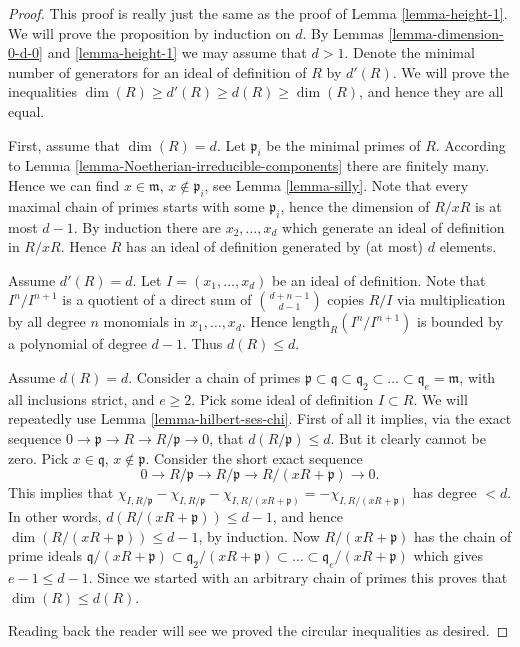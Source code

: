\begin{proof}
This proof is really just the same as the proof of Lemma
\ref{lemma-height-1}. We will prove the proposition by induction
on $d$. By Lemmas \ref{lemma-dimension-0-d-0} and \ref{lemma-height-1}
we may assume that $d > 1$. Denote the minimal number of
generators for an ideal of definition of $R$ by $d'(R)$.
We will prove the inequalities
$\dim(R) \geq d'(R) \geq d(R) \geq \dim(R)$,
and hence they are all equal.

\medskip\noindent
First, assume that $\dim(R) = d$.
Let $\mathfrak p_i$ be the minimal primes of $R$.
According to Lemma \ref{lemma-Noetherian-irreducible-components}
there are finitely many. Hence we can find $x \in \mathfrak m$,
$x \not \in \mathfrak p_i$, see Lemma \ref{lemma-silly}.
Note that every maximal chain of primes starts with some $\mathfrak p_i$,
hence the dimension of $R/xR$ is at most $d-1$. By induction
there are $x_2, \ldots, x_d$ which generate an ideal of definition
in $R/xR$. Hence $R$ has an ideal of definition generated
by (at most) $d$ elements.

\medskip\noindent
Assume $d'(R) = d$. Let $I = (x_1, \ldots, x_d)$ be an ideal
of definition. Note that $I^n/I^{n + 1}$ is a quotient of a direct
sum of $\binom{d + n - 1}{d - 1}$ copies $R/I$ via multiplication
by all degree $n$ monomials in $x_1, \ldots, x_d$.
Hence $\text{length}_R(I^n/I^{n + 1})$ is bounded by a polynomial
of degree $d-1$. Thus $d(R) \leq d$.

\medskip\noindent
Assume $d(R) = d$. Consider a chain of primes
$\mathfrak p \subset \mathfrak q \subset
\mathfrak q_2 \subset \ldots \subset \mathfrak q_e = \mathfrak m$,
with all inclusions strict, and $e \geq 2$.
Pick some ideal of definition $I \subset R$.
We will repeatedly use
Lemma \ref{lemma-hilbert-ses-chi}. First of all
it implies, via the exact sequence
$0 \to \mathfrak p \to R \to R/\mathfrak p \to 0$,
that $d(R/\mathfrak p) \leq d$. But it clearly cannot
be zero. Pick $x\in \mathfrak q$, $x\not \in \mathfrak p$.
Consider the short exact sequence
$$
0 \to R/\mathfrak p \to R/\mathfrak p \to R/(xR + \mathfrak p) \to 0.
$$
This implies that $\chi_{I, R/\mathfrak p} - \chi_{I, R/\mathfrak p}
- \chi_{I, R/(xR + \mathfrak p)} = - \chi_{I, R/(xR + \mathfrak p)}$
has degree $ < d$. In other words, $d(R/(xR + \mathfrak p)) \leq d - 1$,
and hence $\dim(R/(xR + \mathfrak p)) \leq d - 1$, by
induction. Now $R/(xR + \mathfrak p)$ has the chain of prime ideals
$\mathfrak q/(xR + \mathfrak p) \subset \mathfrak q_2/(xR + \mathfrak p)
\subset \ldots \subset \mathfrak q_e/(xR + \mathfrak p)$ which gives
$e - 1 \leq d - 1$. Since we started with an arbitrary chain of
primes this proves that $\dim(R) \leq d(R)$.

\medskip\noindent
Reading back the reader will see we proved the circular
inequalities as desired.
\end{proof}

